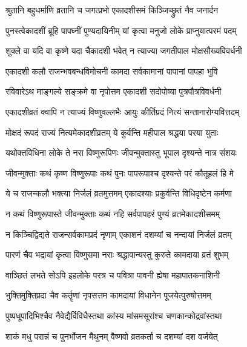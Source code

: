 
\twolineshloka
{श्रुतानि बहुधर्माणि व्रतानि च जगत्प्रभो}
{एकादशीसमं किञ्जिच्छ्रुतं नैव जनार्दन}%

\twolineshloka
{पुनस्त्वेकादशीं ब्रूहि पापघ्नीं पुण्यदायिनीम्}
{यां कृत्वा मनुजो लोके प्राप्नुयात्परमं पदम्}%


\twolineshloka
{शुक्ले वा यदि वा कृष्णे यदा चैकादशी भवेत्}
{न त्याज्या जगतीपाल मोक्षसौख्यविवर्धनी}%

\twolineshloka
{एकादशी कलौ राजन्भवबन्धविमोचनी}
{कामदा सर्वकामानां पापानां पापहा भुवि}%

\twolineshloka
{रविवारेऽथ माङ्गल्ये सङ्क्रमे वा नृपोत्तम}
{एकादशी सदोपोष्या पुत्रपौत्रविवर्धनी}%

\twolineshloka
{एकादशीव्रतं क्वापि न त्याज्यं विष्णुवल्लभैः}
{आयुः कीर्तिप्रदं नित्यं सन्तानारोग्यवित्तदम्}%

\twolineshloka
{मोक्षदं रूपदं राज्यं नित्यमेकादशीव्रतम्}
{ये कुर्वन्ति महीपाल श्रद्धया परया युताः}%

\twolineshloka
{यथोक्तविधिना लोके ते नरा विष्णुरूपिणः }
{जीवन्मुक्तास्तु भूपाल दृश्यन्ते नात्र संशयः}%


\twolineshloka
{जीवन्मुक्ताः कथं कृष्ण विष्णुरूपाः कथं पुनः}
{पापरूपाश्च दृश्यन्ते परं कौतूहलं हि मे}%


\twolineshloka
{ये च राजन्कलौ भक्त्या निर्जलं व्रतमुत्तमम्}
{एकादश्याः प्रकुर्वन्ति विधिदृष्टेन कर्मणा}%

\twolineshloka
{न कथं विष्णुरूपास्ते जीवन्मुक्ताः कथं नहि}
{सर्वपापहरं पुण्यं व्रतमेकादशीसमम्}%

\twolineshloka
{न किञ्चिद्विद्यते राजन्सर्वकामप्रदं नृणाम्}
{एकाशनं दशम्यां च नन्दायां निर्जलं व्रतम्}%

\twolineshloka
{पारणं चैव भद्रायां कृत्वा विष्णुसमा नराः}
{श्रद्धावान्यस्तु कुरुते कामदाया व्रतं शुभम्}%

\twolineshloka
{वाञ्छितं लभते सोऽपि इहलोके परत्र च}
{पवित्रा पावनी ह्येषा महापातकनाशिनी}%

\twolineshloka
{भुक्तिमुक्तिप्रदा चैव कर्तॄणां नृपसत्तम}
{कामदायां विधानेन पूजयेत्पुरुषोत्तमम्}%

\twolineshloka
{पुष्पधूपादिभिश्चैव नैवेद्यैर्विविधैस्तथा}
{कांस्य मांसमसूरांश्च चणकान्कोद्रवांस्तथा}%

\twolineshloka
{शाकं मधु परान्नं च पुनर्भोजन मैथुनम्}
{वैष्णवो व्रतकर्ता च दशम्यां दश वर्जयेत्}%

